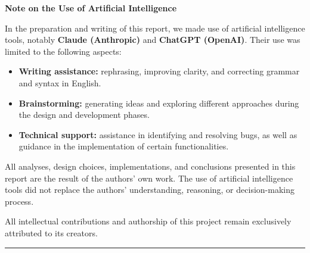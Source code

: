 \newpage
\thispagestyle{fancy}

\begin{center}
  {\normalsize\bfseries Note on the Use of Artificial Intelligence}
\end{center}

\vspace{0.4em}

\noindent In the preparation and writing of this report, we made use of
artificial intelligence tools, notably \textbf{Claude (Anthropic)} and
\textbf{ChatGPT (OpenAI)}. Their use was limited to the following aspects:

\begin{itemize}[topsep=4pt, itemsep=2pt]
  \item \textbf{Writing assistance:} rephrasing, improving clarity, and correcting
        grammar and syntax in English.
  \item \textbf{Brainstorming:} generating ideas and exploring different approaches
        during the design and development phases.
  \item \textbf{Technical support:} assistance in identifying and resolving bugs,
        as well as guidance in the implementation of certain functionalities.
\end{itemize}

\noindent All analyses, design choices, implementations, and conclusions
presented in this report are the result of the authors' own work.
The use of artificial intelligence tools did not replace the authors'
understanding, reasoning, or decision-making process.

\noindent All intellectual contributions and authorship of this project
remain exclusively attributed to its creators.

\vspace{0.6em}
\begin{center}
  \rule{0.5\linewidth}{0.4pt}
\end{center}
